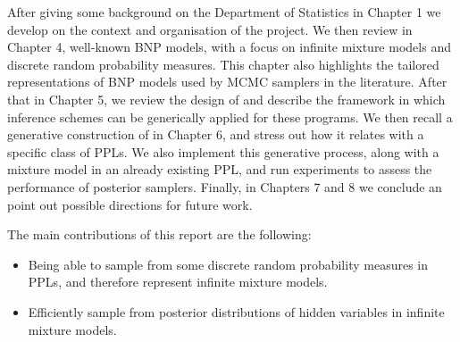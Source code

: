 \documentclass[twoside,10pt,openany,a4paper]{rapport}
\begin{document}
After giving some background on the Department of Statistics in Chapter 1 we develop on the context and organisation of the project. We then review in Chapter 4, well-known \acrlong{BNP} models, with a focus on infinite mixture models and discrete random probability measures. This chapter also highlights the tailored representations of \gls{BNP} models used by \acrlong{MCMC} samplers in the literature. After that in Chapter 5, we review the design of  and describe the framework in which inference schemes can be generically applied for these programs.
We then recall a generative construction of  in Chapter 6, and stress out how it relates with a specific class of \glspl{PPL}. We also implement this generative process, along with a mixture model in an already existing \gls{PPL}, and run experiments to assess the performance of posterior samplers.
Finally, in Chapters 7 and 8 we conclude an point out possible directions for future work.

The main contributions of this report are the following:

\begin{itemize}
  \item Being able to sample from some discrete random probability measures in \glspl{PPL}, and therefore represent infinite mixture models.
  \item Efficiently sample from posterior distributions of hidden variables in infinite mixture models.
\end{itemize}










% 













\end{document}
